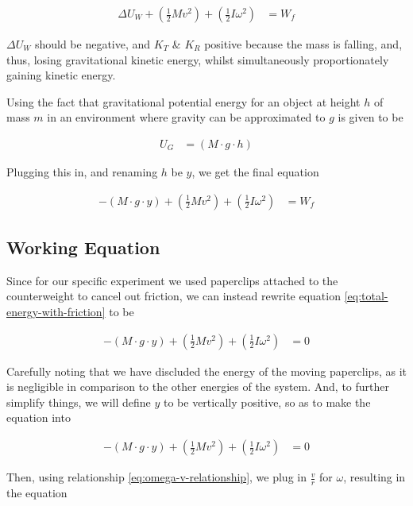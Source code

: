 \documentclass[coverpage]{article}
\begin{document}
	\begin{align}
		\Delta{U}_W + (\frac{1}{2} M v^2) + (\frac{1}{2} I \omega^2)&=W_f
	\end{align}

	$\Delta{U}_W$ should be negative, and $K_T$ \& $K_R$ positive because the mass is falling, and, thus, losing gravitational kinetic energy, whilst simultaneously proportionately gaining kinetic energy.
	
	Using the fact that gravitational potential energy for an object at height $h$ of mass $m$ in an environment where gravity can be approximated to $g$ is given to be
	
	\begin{align}
		U_G&=(M \cdot g \cdot h)
	\end{align}
	
	Plugging this in, and renaming $h$ be $y$, we get the final equation
	
	\newcommand{\mgy}{(M \cdot g \cdot y)}
	
	\begin{align}
		-\mgy + (\frac{1}{2} M v^2) + (\frac{1}{2} I \omega^2)&=W_f \label{eq:total-energy-with-friction}
	\end{align}
	
	\subsection{Working Equation}
	
	Since for our specific experiment we used paperclips attached to the counterweight to cancel out friction, we can instead rewrite equation \ref{eq:total-energy-with-friction} to be
	
	\begin{align}
		-\mgy + (\frac{1}{2} M v^2) + (\frac{1}{2} I \omega^2)&=0
	\end{align}
	
	Carefully noting that we have discluded the energy of the moving paperclips, as it is negligible in comparison to the other energies of the system. And, to further simplify things, we will define $y$ to be vertically positive, so as to make the equation into
	
	\begin{align}
		-\mgy + (\frac{1}{2} M v^2) + (\frac{1}{2} I \omega^2)&=0
	\end{align}

	Then, using relationship \ref{eq:omega-v-relationship}, we plug in $\frac{v}{r}$ for $\omega$, resulting in the equation
	
\end{document}
